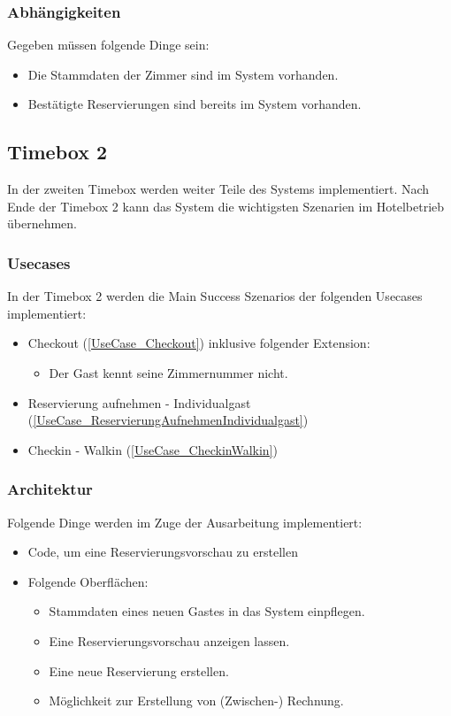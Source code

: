 \subsubsection{Abhängigkeiten}
Gegeben müssen folgende Dinge sein:

\begin{itemize}
	\item Die \Gls{Stammdaten} der \Gls{Zimmer} sind im System vorhanden.
	\item Bestätigte \Gls{Reservierung}en sind bereits im System vorhanden.
\end{itemize}

\subsection{Timebox 2}
In der zweiten Timebox werden weiter Teile des Systems implementiert.
Nach Ende der Timebox 2 kann das System die wichtigsten Szenarien im Hotelbetrieb übernehmen.

\subsubsection{Usecases}
In der Timebox 2 werden die Main Success Szenarios der folgenden Usecases implementiert:

\begin{itemize}
	\item Checkout (\ref{UseCase_Checkout}) inklusive folgender Extension:
	\begin{itemize}
		\item Der \Gls{Gast} kennt seine \Gls{Zimmernummer} nicht.
	\end{itemize}
	\item Reservierung aufnehmen - Individualgast (\ref{UseCase_ReservierungAufnehmenIndividualgast})
	\item Checkin - Walkin (\ref{UseCase_CheckinWalkin})
\end{itemize}

\subsubsection{Architektur}
Folgende Dinge werden im Zuge der Ausarbeitung implementiert:

\begin{itemize}
	\item Code, um eine \Gls{Reservierung}svorschau zu erstellen
	\item Folgende Oberflächen:
	\begin{itemize}
		\item \Gls{Stammdaten} eines neuen \Gls{Gast}es in das System einpflegen.
		\item Eine \Gls{Reservierung}svorschau anzeigen lassen.
		\item Eine neue \Gls{Reservierung} erstellen.
		\item Möglichkeit zur Erstellung von (Zwischen-) \Gls{Rechnung}.
	\end{itemize}
\end{itemize}

